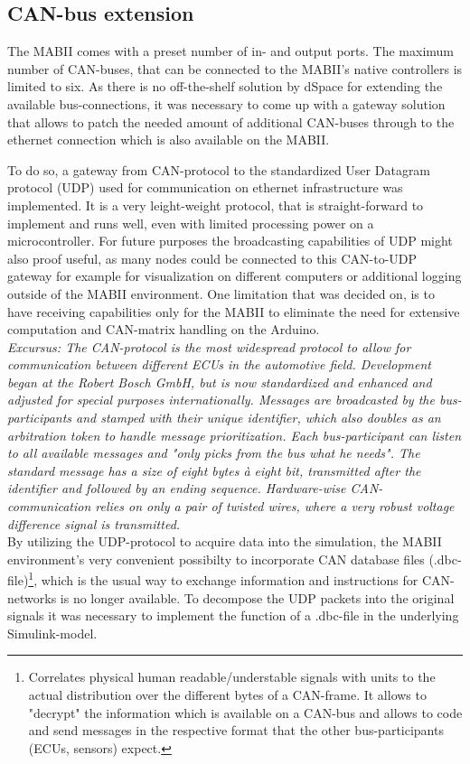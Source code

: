 \documentclass[ExampleMasters.tex]{subfiles}
\begin{document}
\subsection{CAN-bus extension}
\label{sec:can_udp_gateway}
The MABII comes with a preset number of in- and output ports. The maximum number of CAN-buses, that can be connected to the MABII's native controllers is limited to six. As there is no off-the-shelf solution by dSpace for extending the available bus-connections, it was necessary to come up with a gateway solution that allows to patch the needed amount of additional CAN-buses through to the ethernet connection which is also available on the MABII. 

To do so, a gateway from CAN-protocol to the standardized User Datagram protocol (UDP) used for communication on ethernet  infrastructure was implemented. It is a very leight-weight protocol, that is straight-forward to implement and runs well, even with limited processing power on a microcontroller. For future purposes the broadcasting capabilities of UDP might also proof useful, as many nodes could be connected to this CAN-to-UDP gateway for example for visualization on different computers or additional logging outside of the MABII environment. One limitation that was decided on, is to have receiving capabilities only for the MABII to eliminate the need for extensive computation and CAN-matrix handling on the Arduino. \\


\textit{Excursus: The CAN-protocol is the most widespread protocol to allow for communication between different ECUs in the automotive field. Development began at the Robert Bosch GmbH, but is now standardized and enhanced and adjusted for special purposes internationally. Messages are broadcasted by the bus-participants and stamped with their unique identifier, which also doubles as an arbitration token to handle message prioritization. Each bus-participant can listen to all available messages and "only picks from the bus what he needs". The standard message has a size of eight bytes \`{a} eight bit, transmitted after the identifier and followed by an ending sequence. Hardware-wise CAN-communication relies on only a pair of twisted wires, where a very robust voltage difference signal is transmitted. }\cite{CAN_intro}\\


By utilizing the UDP-protocol to acquire data into the simulation, the MABII environment's very convenient possibilty to incorporate CAN database files (.dbc-file)\footnote{Correlates physical human readable/understable signals with units to the actual distribution over the different bytes of a CAN-frame. It allows to "decrypt" the information which is available on a CAN-bus and allows to code and send messages in the respective format that the other bus-participants (ECUs, sensors) expect.}, which is the usual way to exchange information and instructions for CAN-networks is no longer available. To decompose the UDP packets into the original signals it was necessary to implement the function of a .dbc-file in the underlying Simulink-model. 
\end{document}
